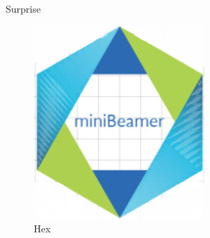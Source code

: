 \documentclass[
  ignorenonframetext,
]{beamer}
\begin{document}
\begin{frame}{Surprise}
\protect\hypertarget{surprise}{}

\begin{figure}
\centering
\includegraphics{logo_beamer.png}
\caption{Hex}
\end{figure}

\end{frame}

\end{document}
